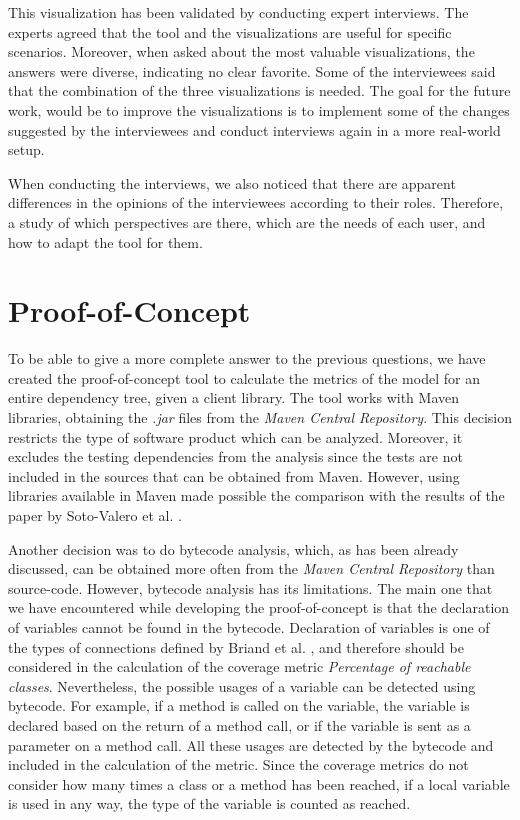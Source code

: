 This visualization has been validated by conducting expert interviews. The experts agreed that the tool and the visualizations are useful for specific scenarios. Moreover, when asked about the most valuable visualizations, the answers were diverse, indicating no clear favorite. Some of the interviewees said that the combination of the three visualizations is needed. The goal for the future work, would be to improve the visualizations is to implement some of the changes suggested by the interviewees and conduct interviews again in a more real-world setup.

When conducting the interviews, we also noticed that there are apparent differences in the opinions of the interviewees according to their roles. Therefore, a study of which perspectives are there, which are the needs of each user, and how to adapt the tool for them.

\section{Proof-of-Concept}

To be able to give a more complete answer to the previous questions, we have created the proof-of-concept tool to calculate the metrics of the model for an entire dependency tree, given a client library. The tool works with Maven libraries, obtaining the \textit{.jar} files from the \textit{Maven Central Repository}. This decision restricts the type of software product which can be analyzed. Moreover, it excludes the testing dependencies from the analysis since the tests are not included in the sources that can be obtained from Maven. However, using libraries available in Maven made possible the comparison with the results of the paper by Soto-Valero et al. \cite{soto2020comprehensive}.

Another decision was to do bytecode analysis, which, as has been already discussed, can be obtained more often from the \textit{Maven Central Repository} than source-code. However, bytecode analysis has its limitations. The main one that we have encountered while developing the proof-of-concept is that the declaration of variables cannot be found in the bytecode. Declaration of variables is one of the types of connections defined by Briand et al. \cite{briand1999unified}, and therefore should be considered in the calculation of the coverage metric \textit{Percentage of reachable classes}. Nevertheless, the possible usages of a variable can be detected using bytecode. For example, if a method is called on the variable, the variable is declared based on the return of a method call, or if the variable is sent as a parameter on a method call. All these usages are detected by the bytecode and included in the calculation of the metric. Since the coverage metrics do not consider how many times a class or a method has been reached, if a local variable is used in any way, the type of the variable is counted as reached.

